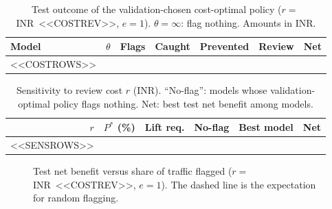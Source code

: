 \documentclass[conference]{IEEEtran}
\newcommand{\inr}{INR~}
\begin{document}
\begin{table}[t]
\centering
\caption{Test outcome of the validation-chosen cost-optimal policy ($r=$\,\inr<<COSTREV>>, $e=1$). $\theta=\infty$: flag nothing. Amounts in INR.}\label{tab:cost}
\footnotesize
\setlength{\tabcolsep}{2.5pt}
\begin{tabular}{@{}lrrrrrr@{}}
\toprule
Model & $\theta$ & Flags & Caught & Prevented & Review & Net \\
\midrule
<<COSTROWS>>
\bottomrule
\end{tabular}
\end{table}

\begin{table}[t]
\centering
\caption{Sensitivity to review cost $r$ (INR). ``No-flag'': models whose validation-optimal policy flags nothing. Net: best test net benefit among models.}\label{tab:sens}
\footnotesize
\setlength{\tabcolsep}{3pt}
\begin{tabular}{@{}rrrcl r@{}}
\toprule
$r$ & $P^{*}$ (\%) & Lift req. & No-flag & Best model & Net \\
\midrule
<<SENSROWS>>
\bottomrule
\end{tabular}
\end{table}

\begin{figure}[t]
\centering
{}
\caption{Test net benefit versus share of traffic flagged ($r=$\,\inr<<COSTREV>>, $e=1$). The dashed line is the expectation for random flagging.}\label{fig:nb}
\end{figure}
\end{document}
